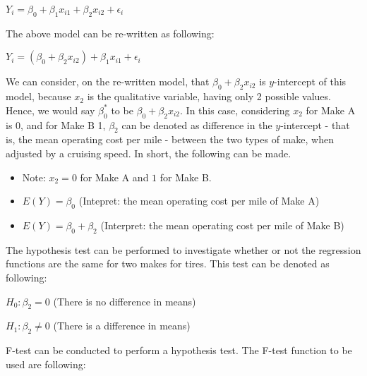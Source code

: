 \documentclass[letterpaper]{article}
\begin{document}
\begin{center}
$Y_i = \beta_0 + \beta_1x_{i1} + \beta_2x_{i2} + \epsilon_i$
\end{center}

\begin{flushleft}
The above model can be re-written as following:
\end{flushleft}

\begin{center}
$Y_i = (\beta_0 + \beta_2x_{i2}) + \beta_1x_{i1} + \epsilon_i$
\end{center}

\begin{flushleft}
We can consider, on the re-written model, that $\beta_0 + \beta_2x_{i2}$ is $y$-intercept of this model, because $x_2$ is the qualitative variable, having only 2 possible values. Hence, we would say $\beta^*_0$ to be $\beta_0 + \beta_2x_{i2}$. In this case, considering $x_2$ for Make A is 0, and for Make B 1, $\beta_2$ can be denoted as difference in the $y$-intercept - that is, the mean operating cost per mile - between the two types of make, when adjusted by a cruising speed. In short, the following can be made.
\end{flushleft}

\begin{itemize}
\item Note: $x_2 = 0$ for Make A and $1$ for Make B.
\item $E(Y) = \beta_0$ (Intepret: the mean operating cost per mile of Make A)
\item $E(Y) = \beta_0 + \beta_2$ (Interpret: the mean operating cost per mile of Make B)
\end{itemize}

\begin{flushleft}
The hypothesis test can be performed to investigate whether or not the regression functions are the same for two makes for tires. This test can be denoted as following:
\end{flushleft}

\begin{center}
$H_0: \beta_2 = 0$ (There is no difference in means)

$H_1: \beta_2 \neq 0$ (There is a difference in means)
\end{center}

\begin{flushleft}
F-test can be conducted to perform a hypothesis test. The F-test function to be used are following:
\end{flushleft}
\end{document}
